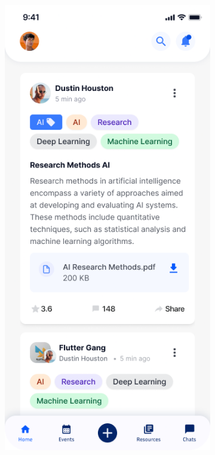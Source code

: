 \begin{figure}[H]
    \centering
    \begin{subfigure}[b]{0.22\textwidth}
        \centering
         \includegraphics[width=\textwidth,height=0.3\textheight,keepaspectratio]{images/front_end_screens/mobile-home.png}

\end{subfigure}
\end{figure}
